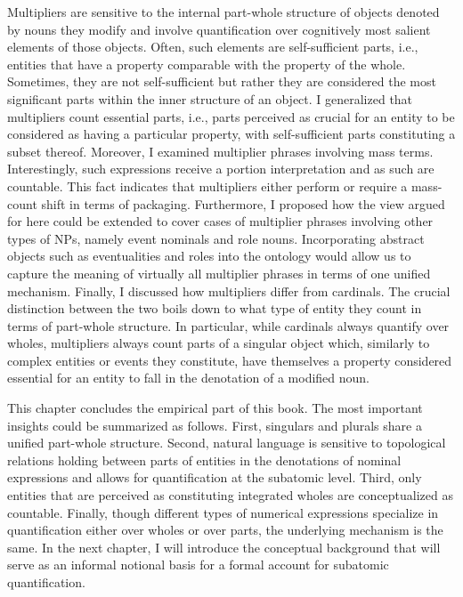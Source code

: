 Multipliers are sensitive to the internal part-whole structure of objects denoted by nouns they modify and involve quantification over cognitively most salient elements of those objects. Often, such elements are self-sufficient parts, i.e., entities that have a property comparable with the property of the whole. Sometimes, they are not self-sufficient but rather they are considered the most significant parts within the inner structure of an object. I generalized that multipliers count essential parts, i.e., parts perceived as crucial for an entity to be considered as having a particular property, with self-sufficient parts constituting a subset thereof. Moreover, I examined multiplier phrases involving mass terms. Interestingly, such expressions receive a portion interpretation and as such are countable. This fact indicates that multipliers either perform or require a mass-count shift in terms of packaging. Furthermore, I proposed how the view argued for here could be extended to cover cases of multiplier phrases involving other types of NPs, namely event nominals and role nouns. Incorporating abstract objects such as eventualities and roles into the ontology would allow us to capture the meaning of virtually all multiplier phrases in terms of one unified mechanism. Finally, I discussed how multipliers differ from cardinals. The crucial distinction between the two boils down to what type of entity they count in terms of part-whole structure. In particular, while cardinals always quantify over wholes, multipliers always count parts of a singular object which, similarly to complex entities or events they constitute, have themselves a property considered essential for an entity to fall in the denotation of a modified noun. 

This chapter concludes the empirical part of this book. The most important insights could be summarized as follows. First, singulars and plurals share a unified part-whole structure. Second, natural language is sensitive to topological relations holding between parts of entities in the denotations of nominal expressions and allows for quantification at the subatomic level. Third, only entities that are perceived as constituting integrated wholes are conceptualized as countable. Finally, though different types of numerical expressions specialize in quantification either over wholes or over parts, the underlying mechanism is the same. In the next chapter, I will introduce the conceptual background that will serve as an informal notional basis for a formal account for subatomic quantification.
